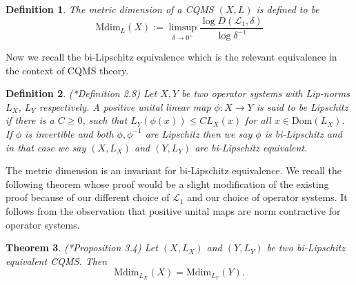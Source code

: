 \documentclass[a4paper,11pt,reqno]{amsart}
\theoremstyle{plain}
\newtheorem{thm}{Theorem}[section]
\newtheorem{defn}[thm]{Definition}
\newtheorem{rem}[thm]{Remark}
\theoremstyle{mainthmstyle}
\theoremstyle{named}
\numberwithin{equation}{section}
\begin{document}
\begin{defn}
    The metric dimension of a CQMS $(X,L)$ is defined to be
    \begin{displaymath}
    \mathrm{Mdim}_{L}(X):=\limsup\limits_{\delta\to 0^{+}} \frac{\log D(\mathcal{L}_{1},\delta)}{\log  \delta^{-1}}
    \end{displaymath}
\end{defn}
Now we recall the bi-Lipschitz equivalence which is the relevant equivalence in the context of CQMS theory.
\begin{defn}
    \label{bi-lipschitz_equivalence}(\cite{Kerr}*{Definition 2.8}) Let $X,Y$ be two operator systems with Lip-norms $L_{X}$, $L_{Y}$ respectively. A positive unital linear map $\phi:X\rightarrow Y$ is said to be Lipschitz if there is a $C\geq 0$, such that $L_{Y}(\phi(x))\leq C L_{X}(x)$ for all $x\in \mathrm{Dom}(L_{X})$. If $\phi$ is invertible and both $\phi,\phi^{-1}$ are Lipschitz then we say $\phi$ is bi-Lipschitz and in that case we say $(X,L_X)$ and $(Y,L_Y)$ are bi-Lipschitz equivalent.
\end{defn}
The metric dimension is an invariant for bi-Lipschitz equivalence. We recall the following theorem whose proof would be a slight modification of the existing proof because of our different choice of $\mathcal{L}_1$ and our choice of operator systems. It follows from the observation that positive unital maps are norm contractive for operator systems.
\begin{thm}
    \label{Metric_inv}(\cite{Kerr}*{Proposition 3.4}) Let $(X,L_X)$ and $(Y,L_{Y})$ be two bi-Lipschitz equivalent CQMS. Then 
    \begin{displaymath}
        \mathrm{Mdim}_{L_X}(X)=\mathrm{Mdim}_{L_{Y}}(Y).
    \end{displaymath}
\end{thm}
\end{document}
